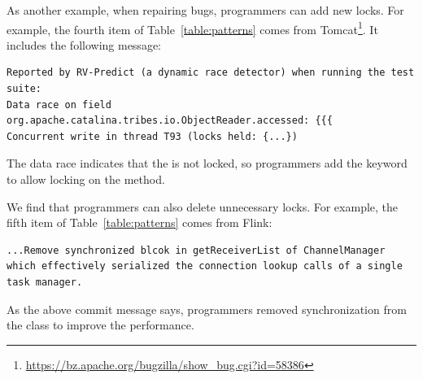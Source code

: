 As another example, when repairing bugs, programmers can add new locks. For example, the fourth item of Table~\ref{table:patterns} comes from Tomcat\footnote{\url{https://bz.apache.org/bugzilla/show\_bug.cgi?id=58386}}. It includes the following message:

\begin{lstlisting}
Reported by RV-Predict (a dynamic race detector) when running the test suite:
Data race on field org.apache.catalina.tribes.io.ObjectReader.accessed: {{{
Concurrent write in thread T93 (locks held: {...})
\end{lstlisting}

The data race indicates that the  is not locked, so programmers add the  keyword to allow locking on the method.


We find that programmers can also delete unnecessary locks. For example, the fifth item of Table~\ref{table:patterns} comes from Flink:

\begin{lstlisting}
...Remove synchronized blcok in getReceiverList of ChannelManager which effectively serialized the connection lookup calls of a single task manager.
\end{lstlisting}

As the above commit message says, programmers removed synchronization from the  class to improve the performance.








